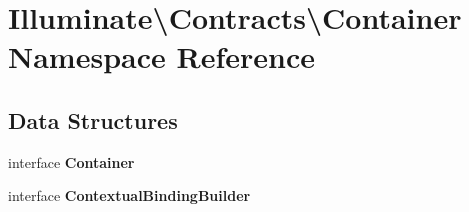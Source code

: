 \section{Illuminate\textbackslash{}Contracts\textbackslash{}Container Namespace Reference}
\label{namespace_illuminate_1_1_contracts_1_1_container}
\subsection*{Data Structures}
\begin{DoxyCompactItemize}
\item 
interface {\bf Container}
\item 
interface {\bf Contextual\+Binding\+Builder}
\end{DoxyCompactItemize}
